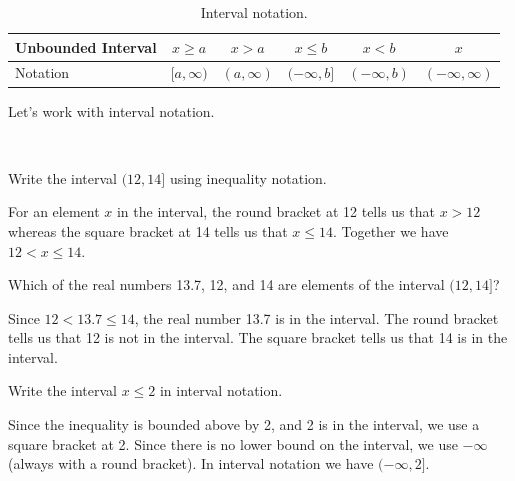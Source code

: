 \begin{defn}[Intervals]
\begin{apart}
\begin{table}[ht]
            \begin{tabular}{l | c|c|c|c | c}
                Unbounded Interval 
                & $x \ge a$
                & $x > a$
                & $x \le b$
                & $x < b$
                & $x$
                \\ \hline  
                Notation 
                & $[a,\infty)$
                & $(a,\infty)$
                & $(-\infty,b]$
                & $(-\infty,b)$
                & $(-\infty,\infty)$
            \end{tabular}
            \caption{Interval notation.}
            \label{table_interval_notation}
        \end{table}
    \end{apart}
\end{defn}

Let's work with interval notation.

\begin{exam}
\label{exam_interval_notation}
~
    \begin{apart}
        \item Write the interval $(12,14]$ using inequality notation. 
            \begin{soln}
                For an element $x$ in the interval, the round bracket at 12 tells us that $x > 12$ whereas the square bracket at 14 tells us that $x \le 14$.  Together we have $12 < x \le 14$.
            \end{soln}
        \item Which of the real numbers 13.7, 12, and 14 are elements of the interval $(12,14]$?
            \begin{soln}
                Since $12 < 13.7 \le 14$, the real number 13.7 is in the interval.  The round bracket tells us that 12 is not in the interval. The square bracket tells us that 14 is in the interval.
            \end{soln}
        \item Write the interval $x \le 2$ in interval notation.
            \begin{soln}
                Since the inequality is bounded above by 2, and 2 is in the interval, we use a square bracket at 2. Since there is no lower bound on the interval, we use $-\infty$ (always with a round bracket).  In interval notation we have $(- \infty,2]$.
            \end{soln}
    \end{apart}
\end{exam}

